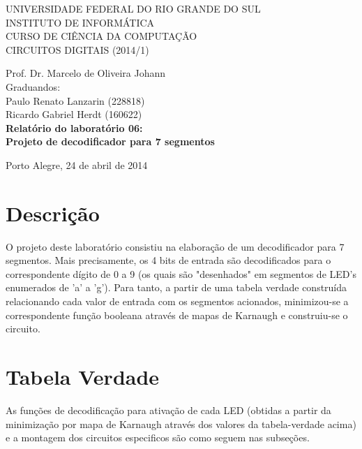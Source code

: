 \documentclass[a4paper]{article}
\begin{document}
\begin{titlepage}
\begin{center}


\large{ 
\uppercase{ Universidade Federal do Rio Grande do Sul\\

Instituto de Informática \\

Curso de Ciência da Computação \\

Circuitos Digitais (2014/1)\\
}

Prof. Dr. Marcelo de Oliveira Johann \\

Graduandos: \\ Paulo Renato Lanzarin (228818)
			\\ Ricardo Gabriel Herdt (160622) \\ [4.5cm]


\LARGE {\bfseries Relatório do laboratório 06: \\
	Projeto de decodificador para 7 segmentos\\[1.0cm]
}}


\vfill

Porto Alegre, 24 de abril de 2014

\end{center}
\end{titlepage}
\section{Descrição}

	O projeto deste laboratório consistiu na elaboração de um decodificador
para 7 segmentos. Mais precisamente, os 4 bits de entrada são decodificados
para o correspondente dígito de 0 a 9 (os quais são "desenhados" em segmentos
de LED's enumerados de 'a' a 'g'). Para tanto, a partir de uma tabela verdade
construída relacionando cada valor de entrada com os segmentos acionados,
minimizou-se a correspondente função booleana através de mapas de Karnaugh e
construiu-se o circuito.



\FloatBarrier
\section{Tabela Verdade}

	As funções de decodificação para ativação de cada LED (obtidas a partir da minimização por mapa de Karnaugh através dos valores da tabela-verdade acima) e a montagem dos circuitos especificos são como seguem nas subseções.
\end{document}
